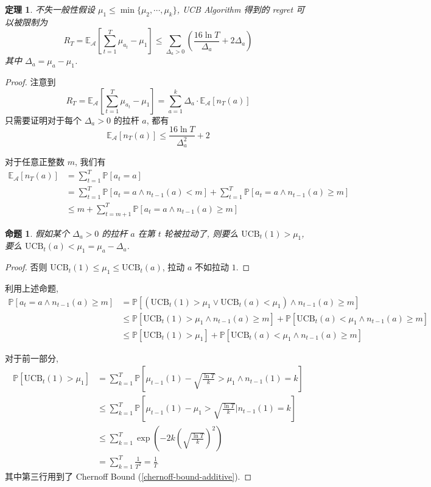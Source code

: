 \documentclass[8pt]{article}
\theoremstyle{compact}
\newtheorem{theorem}{定理}[section]
\newtheorem{proposition}{命题}[section]
\def\le{\leqslant}
\def\ge{\geqslant}
\def\P#1{\mathbb{P}\left[{#1}\right]}
\begin{document}
\begin{theorem}
	不失一般性假设 $\mu_1 \le \min\{\mu_2, \cdots, \mu_k\}$, UCB Algorithm 得到的 regret 可以被限制为
	$$R_T = \mathbb E_{\mathcal A}\left[\sum_{t=1}^T\mu_{a_t} - \mu_1\right] \le \sum_{\Delta_a > 0}\left(\frac{16\ln T}{\Delta_a} + 2\Delta_a\right)$$
	其中 $\Delta_a = \mu_a - \mu_1$.
\end{theorem}
\begin{proof}
	注意到 $$R_T = \mathbb E_{\mathcal A}\left[\sum_{t=1}^T\mu_{a_t} - \mu_1\right] = \sum_{a=1}^{k}\Delta_a \cdot \mathbb E_{\mathcal A}[n_T(a)]$$ 只需要证明对于每个 $\Delta_a > 0$ 的拉杆 $a$, 都有 $$\mathbb E_{\mathcal A}[n_T(a)] \le \frac{16\ln T}{\Delta_a^2} + 2$$

	对于任意正整数 $m$, 我们有 \begin{equation*}
		\begin{split}
			\mathbb E_{\mathcal A}[n_T(a)] &= \sum_{t=1}^T \P{a_t = a} \\
			&= \sum_{t=1}^T \P{a_t = a \wedge n_{t-1}(a) < m} + \sum_{t=1}^T \P{a_t = a \wedge n_{t-1}(a) \ge m}\\
			&\le m + \sum_{t=m+1}^T \P{a_t = a \wedge n_{t-1}(a) \ge m}
		\end{split}
	\end{equation*}

	\begin{proposition}
		假如某个 $\Delta_a > 0$ 的拉杆 $a$ 在第 $t$ 轮被拉动了, 则要么 $\text{UCB}_t(1) > \mu_1$, 要么 $\text{UCB}_t(a) < \mu_1 = \mu_a - \Delta_a$.
	\end{proposition}
	\begin{proof}
		否则 $\text{UCB}_t(1) \le \mu_1 \le \text{UCB}_t(a)$, 拉动 $a$ 不如拉动 $1$.
	\end{proof}

	利用上述命题, \begin{equation*}
		\begin{split}
			\P{a_t = a \wedge n_{t-1}(a) \ge m} &= \P{\left(\text{UCB}_t(1) > \mu_1 \vee \text{UCB}_t(a) < \mu_1\right) \wedge n_{t-1}(a) \ge m}\\
			&\le \P{\text{UCB}_t(1) > \mu_1 \wedge n_{t-1}(a) \ge m} + \P{\text{UCB}_t(a) < \mu_1 \wedge n_{t-1}(a) \ge m}\\
			&\le \P{\text{UCB}_t(1) > \mu_1} + \P{\text{UCB}_t(a) < \mu_1 \wedge n_{t-1}(a) \ge m}
		\end{split}
	\end{equation*}

	对于前一部分, \begin{equation*}
		\begin{split}
			\P{\text{UCB}_t(1) > \mu_1} &= \sum_{k=1}^T \P{\mu_{t-1}(1) - \sqrt{\frac{\ln T}{k}} > \mu_1 \wedge n_{t-1}(1) = k} \\
			&\le \sum_{k=1}^T \P{\mu_{t-1}(1) - \mu_1 > \sqrt{\frac{\ln T}{k}} \bigg| n_{t-1}(1) = k}\\
			&\le \sum_{k=1}^T \exp\left(-2k\left(\sqrt{\frac{\ln T}{k}}\right)^2\right) \\
			&= \sum_{k=1}^T \frac{1}{T^2} = \frac 1T
		\end{split}
	\end{equation*}
	其中第三行用到了 Chernoff Bound (\cref{chernoff-bound-additive}).
	

\end{proof}
\end{document}

